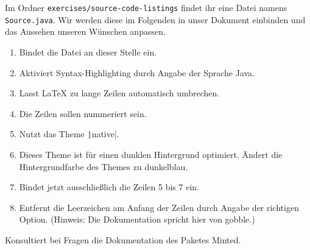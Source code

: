 Im Ordner \texttt{exercises/source-code-listings} findet ihr eine Datei namens \texttt{Source.java}.
Wir werden diese im Folgenden in unser Dokument einbinden und das Aussehen unseren Wünschen anpassen.

\begin{enumerate}
  \item Bindet die Datei an dieser Stelle ein.
  \item Aktiviert Syntax-Highlighting durch Angabe der Sprache Java.
  \item Lasst LaTeX zu lange Zeilen automatisch umbrechen.
  \item Die Zeilen sollen nummeriert sein.
  \item Nutzt das Theme \texttt|native|.
  \item Dieses Theme ist für einen dunklen Hintergrund optimiert. Ändert die Hintergrundfarbe des Themes zu dunkelblau.
  \item Bindet jetzt ausschließlich die Zeilen 5 bis 7 ein.
  \item Entfernt die Leerzeichen am Anfang der Zeilen durch Angabe der richtigen Option. (Hinweis: Die Dokumentation spricht hier von gobble.)
\end{enumerate}

Konsultiert bei Fragen die Dokumentation des Paketes Minted.

